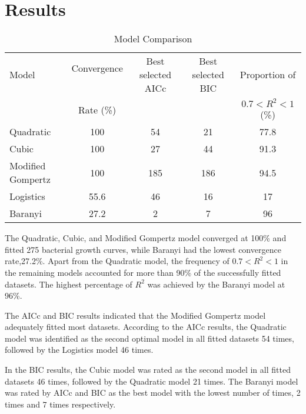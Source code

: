 \documentclass{article}
\begin{document}
\section{Results}



\begin{table}[h]
    \centering
    \caption{Model Comparison}
    \renewcommand{\arraystretch}{1.2} %
    \begin{tabular}{l c c c c}  %
        \toprule
        Model & Convergence \  & {\small Best selected AICc} & {\small Best selected BIC} & Proportion of \\ 
              & Rate (\%)      &                             &                            & $0.7< R^2 < 1$ (\%) \\
        \midrule
        Quadratic  & 100  & 54  & 21  & 77.8  \\
        Cubic      & 100  & 27  & 44   & 91.3 \\
        Modified Gompertz   & 100  & 185  & 186  & 94.5 \\
        Logistics   & 55.6 & 46  & 16  & 17 \\
        Baranyi   & 27.2 & 2  & 7  & 96 \\
        \bottomrule
    \end{tabular}
    \label{tab:model_comparison}
\end{table}








The Quadratic, Cubic, and Modified Gompertz model converged at 100\% and fitted 275 bacterial growth curves, while Baranyi had the lowest convergence rate,27.2\%. Apart from the Quadratic model, the frequency of $0.7 < R^2 < 1$ in the remaining models accounted for more than 90\% of the successfully fitted datasets. The highest percentage of $R^2$ was achieved by the Baranyi model at 96\%.

The AICc and BIC results indicated that the Modified Gompertz model adequately fitted most datasets. According to the AICc results, the Quadratic model was identified as the second optimal model in all fitted datasets 54 times, followed by the Logistics model 46 times.

In the BIC results, the Cubic model was rated as the second model in all fitted datasets 46 times, followed by the Quadratic model 21 times. The Baranyi model was rated by AICc and BIC as the best model with the lowest number of times, 2 times and 7 times respectively.
\end{document}

